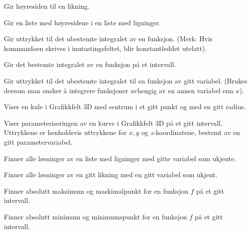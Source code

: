 {Gir høyresiden til en likning.}

{Gir en liste med høyresidene i en liste med ligninger.}

{Gir uttrykket til det ubestemte integralet av en funksjon. (Merk: Hvis kommandoen skrives i inntastingsfeltet, blir konstantleddet utelatt).}

{Gir det bestemte integralet av en funksjon på et intervall.}

{Gir uttrykket til det ubestemte integralet til en funksjon av gitt variabel. (Brukes dersom man ønsker å integrere funksjoner avhengig av en annen variabel enn $ x $).}

{Viser en kule i Grafikkfelt 3D med sentrum i et gitt punkt og med en gitt radius.}

{Viser parameteriseringen av en kurve i Grafikkfelt 3D på et gitt intervall. Uttrykkene er henholdsvis uttrykkene for $ {x, y} $ og $ z $-koordinatene, bestemt av en gitt parametervariabel.
	
}



{Finner alle løsninger av en liste med ligninger med gitte variabel som ukjente.}

{Finner alle løsninger av en gitt likning med en gitt variabel som ukjent.}

 {Finner absolutt maksimum og maskimalpunkt for en funksjon $ f $ på et gitt intervall.}

 {Finner absolutt minimum og minimumspunkt for en funksjon $ f $ på et gitt intervall.}

